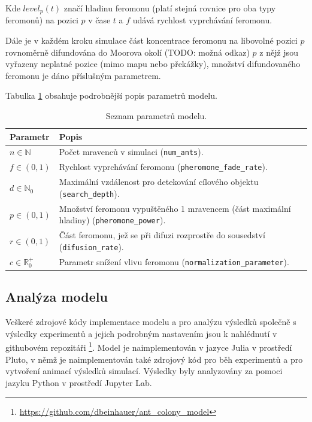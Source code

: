 \documentclass[10pt,a4paper,twocolumn]{article}
\begin{document}
Kde $level_{p}(t)$ značí hladinu feromonu (platí stejná rovnice pro oba typy feromonů) 
na pozici $p$ v čase $t$ a $f$ udává rychlost vyprchávání feromonu.

Dále je v každém kroku simulace část koncentrace feromonu na libovolné pozici $p$ 
rovnoměrně difundována do Moorova okolí (TODO: možná odkaz) $p$ z nějž jsou vyřazeny neplatné pozice
(mimo mapu nebo překážky), množství difundovaného feromonu je dáno 
příslušným parametrem.

Tabulka \ref{table:parametry} obsahuje podrobnější popis parametrů modelu.


\begin{table}[t]
  \centering %
  \begin{tabular}{l p{5cm}}
  \toprule
  Parametr & Popis \\
  \midrule
    $n \in \mathbb{N}$ & Počet mravenců v simulaci 
    (\texttt{num\_ants}). \\ 
    $f \in (0, 1)$ & Rychlost vyprchávání feromonu 
    (\texttt{pheromone\_fade\_rate}). \\
    $d \in \mathbb{N}_0$ & Maximální vzdálenost pro detekování 
    cílového objektu (\texttt{search\_depth}).\\
    $p \in (0, 1)$ & Množství feromonu vypuštěného 1 mravencem 
    (část maximální hladiny) (\texttt{pheromone\_power}).\\
    $r \in (0, 1)$ & Část feromonu, jež se při difuzi rozprostře do 
    sousedství (\texttt{difusion\_rate}). \\
    $c \in \mathbb{R}_0^{+}$ & Parametr snížení vlivu feromonu
    (\texttt{normalization\_parameter}).\\ 
  \bottomrule
  \end{tabular}
  \caption{Seznam parametrů modelu.} \label{table:parametry} 
\end{table}



\subsection{Analýza modelu}

Veškeré zdrojové kódy implementace modelu a pro analýzu výsledků společně s
výsledky experimentů a jejich podrobným nastavením jsou k nahlédnutí v 
githubovém repozitáři 
\footnote{\url{https://github.com/dbeinhauer/ant_colony_model}}. Model je 
naimplementován v jazyce Julia v prostředí Pluto, v němž je naimplementován
také zdrojový kód pro běh experimentů a pro vytvoření animací výsledků
simulací. Výsledky byly analyzovány za pomoci jazyku Python v prostředí 
Jupyter Lab.
\end{document}
